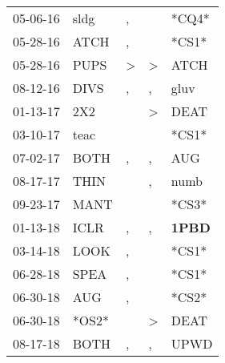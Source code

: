 \begin{supertabular}{p{0.07\textwidth}p{0.06\textwidth}p{0.02\textwidth}p{0.02\textwidth}p{0.06\textwidth}}
          05-06-16\textsuperscript{} &           sldg\textsuperscript{} &                , &               &                            *CQ4* \\
          05-28-16\textsuperscript{} &           ATCH\textsuperscript{} &                , &               &                            *CS1* \\
          05-28-16\textsuperscript{} &           PUPS\textsuperscript{} &     \textgreater &  \textgreater &           ATCH\textsuperscript{} \\
          08-12-16\textsuperscript{} &           DIVS\textsuperscript{} &                , &             , &           gluv\textsuperscript{} \\
          01-13-17\textsuperscript{} &            2X2\textsuperscript{} &                  &  \textgreater &           DEAT\textsuperscript{} \\
          03-10-17\textsuperscript{} &           teac\textsuperscript{} &                  &               &                            *CS1* \\
          07-02-17\textsuperscript{} &           BOTH\textsuperscript{} &                , &             , &            AUG\textsuperscript{} \\
          08-17-17\textsuperscript{} &           THIN\textsuperscript{} &                  &             , &           numb\textsuperscript{} \\
          09-23-17\textsuperscript{} &           MANT\textsuperscript{} &                  &               &                            *CS3* \\
          01-13-18\textsuperscript{} &           ICLR\textsuperscript{} &                , &             , &  \textbf{1PBD\textsuperscript{}} \\
          03-14-18\textsuperscript{} &           LOOK\textsuperscript{} &                , &               &                            *CS1* \\
          06-28-18\textsuperscript{} &           SPEA\textsuperscript{} &                , &               &                            *CS1* \\
          06-30-18\textsuperscript{} &            AUG\textsuperscript{} &                , &               &                            *CS2* \\
          06-30-18\textsuperscript{} &                            *OS2* &                  &  \textgreater &           DEAT\textsuperscript{} \\
          08-17-18\textsuperscript{} &           BOTH\textsuperscript{} &                , &             , &           UPWD\textsuperscript{} \\

\end{supertabular}
